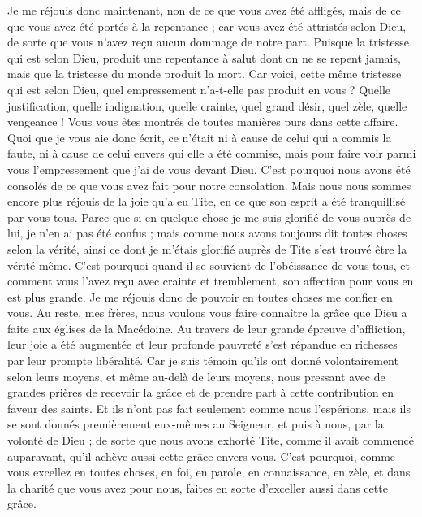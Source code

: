 \begin{multicols}{2}
Je me réjouis donc maintenant, non de ce que vous avez été affligés, mais de ce que vous avez été portés à la repentance ; car vous avez été attristés selon Dieu, de sorte que vous n'avez reçu aucun dommage de notre part.
Puisque la tristesse qui est selon Dieu, produit une repentance à salut dont on ne se repent jamais, mais que la tristesse du monde produit la mort.
Car voici, cette même tristesse qui est selon Dieu, quel empressement n'a-t-elle pas produit en vous ? Quelle justification, quelle indignation, quelle crainte, quel grand désir, quel zèle, quelle vengeance ! Vous vous êtes montrés de toutes manières purs dans cette affaire.
Quoi que je vous aie donc écrit, ce n'était ni à cause de celui qui a commis la faute, ni à cause de celui envers qui elle a été commise, mais pour faire voir parmi vous l'empressement que j'ai de vous devant Dieu.
C'est pourquoi nous avons été consolés de ce que vous avez fait pour notre consolation. Mais nous nous sommes encore plus réjouis de la joie qu'a eu Tite, en ce que son esprit a été tranquillisé par vous tous.
Parce que si en quelque chose je me suis glorifié de vous auprès de lui, je n'en ai pas été confus ; mais comme nous avons toujours dit toutes choses selon la vérité, ainsi ce dont je m'étais glorifié auprès de Tite s'est trouvé être la vérité même.
C'est pourquoi quand il se souvient de l'obéissance de vous tous, et comment vous l'avez reçu avec crainte et tremblement, son affection pour vous en est plus grande.
Je me réjouis donc de pouvoir en toutes choses me confier en vous.
\VerseOne{}Au reste, mes frères, nous voulons vous faire connaître la grâce que Dieu a faite aux églises de la Macédoine.
Au travers de leur grande épreuve d'affliction, leur joie a été augmentée et leur profonde pauvreté s'est répandue en richesses par leur prompte libéralité.
Car je suis témoin qu'ils ont donné volontairement selon leurs moyens, et même au-delà de leurs moyens,
nous pressant avec de grandes prières de recevoir la grâce et de prendre part à cette contribution en faveur des saints.
Et ils n'ont pas fait seulement comme nous l'espérions, mais ils se sont donnés premièrement eux-mêmes au Seigneur, et puis à nous, par la volonté de Dieu ;
de sorte que nous avons exhorté Tite, comme il avait commencé auparavant, qu'il achève aussi cette grâce envers vous.
C'est pourquoi, comme vous excellez en toutes choses, en foi, en parole, en connaissance, en zèle, et dans la charité que vous avez pour nous, faites en sorte d'exceller aussi dans cette grâce.

\end{multicols}
